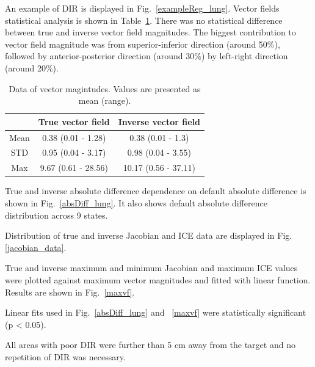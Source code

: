 An example of DIR is displayed in Fig.~\ref{exampleReg_lung}. Vector fields statistical analysis is shown in Table~\ref{tab:vectordata_lung}. There was no statistical
difference between true and inverse vector field magnitudes. The biggest contribution to vector field magnitude was from superior-inferior direction (around 50\%), followed by anterior-posterior direction (around 30\%)
by left-right direction (around 20\%).

\begin{table}[H]
  \centering
  \caption{Data of vector magintudes. Values are presented as mean (range).}
  \begin{tabular}{c|c|c}
  
       & True vector field & Inverse vector field  \\
       \hline
       Mean & 0.38 (0.01 - 1.28) & 0.38 (0.01 - 1.3) \\ 
       STD & 0.95 (0.04 - 3.17) & 0.98 (0.04 - 3.55) \\ 
       Max & 9.67 (0.61 - 28.56) & 10.17 (0.56 - 37.11) \\
    \hline\hline
  \end{tabular}
  \label{tab:vectordata_lung}
\end{table}

True and inverse absolute difference dependence on default absolute difference is shown in Fig.~\ref{absDiff_lung}. It also shows default absolute difference distribution across 9 states. 

Distribution of true and inverse Jacobian and ICE data are displayed in Fig. \ref{jacobian_data}. 

True and inverse maximum and minimum Jacobian and maximum ICE values were plotted against maximum vector magnitudes and fitted with linear function. Results are shown in Fig.~\ref{maxvf}.


Linear fits used in Fig.~\ref{absDiff_lung} and ~\ref{maxvf} were statistically significant (p < 0.05).

All areas with poor DIR were further than 5 cm away from the target and no repetition of DIR was necessary.

